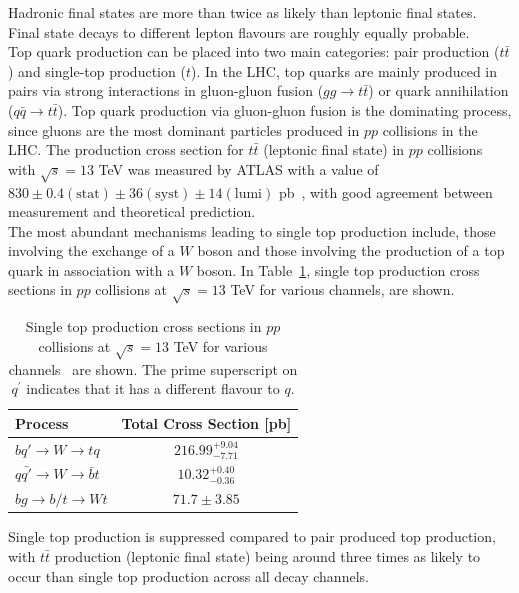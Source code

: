 \noindent
Hadronic final states are more than twice as likely than leptonic final states. Final state decays to different lepton flavours are roughly equally probable.\\
Top quark production can be placed into two main categories: pair production ($t\bar{t}$) and single-top production ($t$). In the LHC, top quarks are mainly produced in pairs via strong interactions in gluon-gluon fusion ($gg\rightarrow t\bar{t}$) or quark annihilation ($q\bar{q}\rightarrow t\bar{t}$). Top quark production via gluon-gluon fusion is the dominating process, since gluons are the most dominant particles produced in $pp$ collisions in the LHC. The production cross section for $t\bar{t}$ (leptonic final state) in $pp$ collisions with $\sqrt{s} = 13$ TeV was measured by ATLAS with a value of $830 \pm 0.4 (\text{stat}) \pm 36 (\text{syst}) \pm 14 (\text{lumi})$ pb~\cite{ATLAS-tt-crossSection-2020}, with good agreement between measurement and theoretical prediction.\\

\noindent
The most abundant mechanisms leading to single top production include, those involving the exchange of a $W$ boson and those involving the production of a top quark in association with a $W$ boson. In Table~\ref{tab:single-top-crossSection}, single top production cross sections in $pp$ collisions at $\sqrt{s}=13$ TeV for various channels, are shown.


\begin{table}[h!]
\def\arraystretch{1.5}%
\begin{tabular}{l|c}
\hline
Process & Total Cross Section [pb] \\ \hline
$bq'\rightarrow W \rightarrow tq$ &  $216.99^{+9.04}_{-7.71}$\\
 $q\bar{q'}\rightarrow   W \rightarrow \bar{b}t$& $10.32^{+0.40}_{-0.36}$  \\
$bg \rightarrow  b/t \rightarrow Wt$ &  $71.7\pm 3.85$\\ \hline
\end{tabular}
\centering
\caption{Single top production cross sections in $pp$ collisions at $\sqrt{s}=13$ TeV for various channels~\cite{summaryPlots} are shown. The prime superscript on $q^{'}$ indicates that it has a different flavour to $q$. }
\label{tab:single-top-crossSection}
\end{table}
\noindent
Single top production is suppressed compared to pair produced top production, with $t\bar{t}$ production (leptonic final state) being around three times as likely to occur than single top production across all decay channels.

